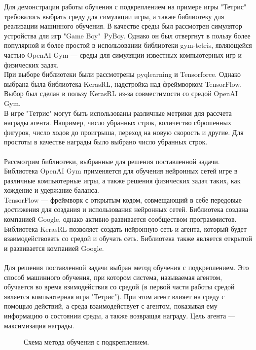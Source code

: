 \documentclass{article}
\begin{document}
Для демонстрации работы обучения с подкреплением на примере игры "Тетрис" требовалось выбрать среду для симуляции игры, а также библиотеку для реализации машинного обучения. 
В качестве среды был рассмотрен симулятор устройства для игр "Game Boy"\ PyBoy\cite{litlink11}. Однако он был отвергнут в пользу более популярной и более простой в использовании библиотеки gym-tetris\cite{litlink12}, являющейся частью OpenAI Gym\cite{litlink13} — среды для симуляции известных компьютерных игр и физических задач.\\
При выборе библиотеки были рассмотрены pyqlearning\cite{litlink14} и Tensorforce\cite{litlink15}. Однако выбрана была библиотека KerasRL\cite{litlink16}, надстройка над фреймворком TensorFlow\cite{litlink17}. Выбор был сделан в пользу KerasRL из-за совместимости со средой OpenAI Gym.\\
В игре "Тетрис" могут быть использованы различные метрики для рассчета награды агента. Например, число убранных строк, количество сброшенных фигурок, число ходов до проигрыша, переход на новую скорость и другие. Для простоты в качестве награды было выбрано число убранных строк.\\~\\
Рассмотрим библиотеки, выбранные для решения поставленной задачи. Библиотека OpenAI Gym применяется для обучения нейронных сетей игре в различные компьютерные игры, а также решения физических задач таких, как хождение и удержание баланса. \\
TensorFlow — фреймворк с открытым кодом, совмещающий в себе передовые достижения для создания и использования нейронных сетей. Библиотека создана компанией Google, однако активно развивается сообществом программистов\cite{litlink18}.\\
Библиотека KerasRL позволяет создать нейронную сеть и агента, который будет взаимодействовать со средой и обучать сеть. Библиотека также является открытой и развивается компанией Google.\\~\\
Для решения поставленной задачи выбран метод обучения с подкреплением. Это способ машинного обучения, при котором система, называемая агентом, обучается во время взимодействия со средой (в первой части работы средой является компьютерная игра "Тетрис"). При этом агент влияет на среду с помощью действий, а среда взаимодействует с агентом, показывая ему информацию о состоянии среды, а также возвращая награду. Цель агента — максимизация награды.\\
\begin{figure}[h]
\caption{Схема метода обучения с подкреплением\cite{litlink19}.}
\label{ris:image}
\end{figure}
\end{document}

